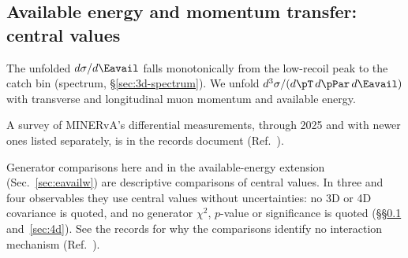 \subsection{Available energy and momentum transfer: central values}
\label{sec:3d}

The unfolded $d\sigma/d\Eavail$ falls monotonically from the low-recoil peak to the catch bin (spectrum, \S\ref{sec:3d-spectrum}). We unfold $d^{3}\sigma/(d\pT\,d\pPar\,d\Eavail)$ with transverse and longitudinal muon momentum and available energy.

A survey of MINERvA's differential measurements, through 2025 and with newer ones listed separately, is in the records document (Ref.~\cite{NoteRecords2026}).

Generator comparisons here and in the available-energy extension (Sec.~\ref{sec:eavailw}) are descriptive comparisons of central values. In three and four observables they use central values without uncertainties: no 3D or 4D covariance is quoted, and no generator $\chi^{2}$, $p$-value or significance is quoted (\S\S\ref{sec:3d} and~\ref{sec:4d}). See the records for why the comparisons identify no interaction mechanism (Ref.~\cite{NoteRecords2026}).


